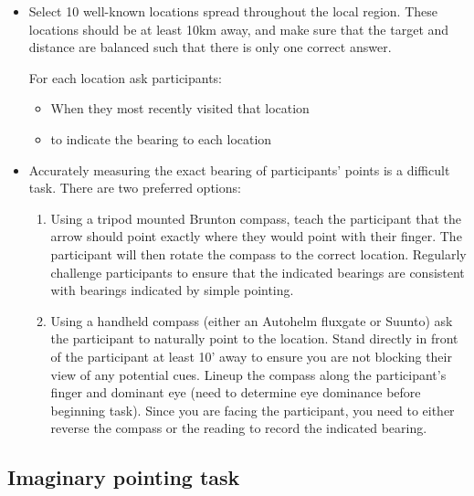 \documentclass{article}
\begin{document}
\begin{itemize}

\item Select 10 well-known locations spread throughout the local region.  These locations should be at least 10km away, and make sure that the target and distance are balanced such that there is only one correct answer.

For each location ask participants:

	\begin{itemize}

	\item When they most recently visited that location

	\item to indicate the bearing to each location
	
	\end{itemize}

\item Accurately measuring the exact bearing of participants' points is a difficult task.  There are two preferred options:

	\begin{enumerate}

	\item Using a tripod mounted Brunton compass, teach the participant that the arrow should point exactly where they would point with their finger.  The participant will then rotate the compass to the correct location.  Regularly challenge participants to ensure that the indicated bearings are consistent with bearings indicated by simple pointing.

	\item Using a handheld compass (either an Autohelm fluxgate or Suunto) ask the participant to naturally point to the location.  Stand directly in front of the participant at least 10' away to ensure you are not blocking their view of any potential cues.  Lineup the compass along the participant's finger and dominant eye (need to determine eye dominance before beginning task).  Since you are facing the participant, you need to either reverse the compass or the reading to record the indicated bearing.  
	
	\end{enumerate}


\end{itemize}


\subsection{Imaginary pointing task}
\end{document}
